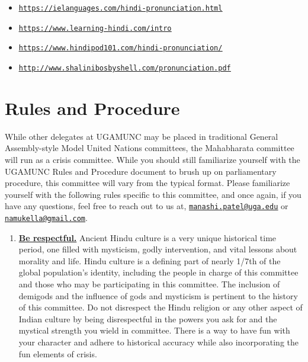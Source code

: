 \documentclass[10pt, letterpaper]{article}
\begin{document}
\begin{itemize}
\item
  
  \texttt{\href{https://ielanguages.com/hindi-pronunciation.html}{\underline{https://ielanguages.com/hindi-pronunciation.html}}}
  
\item
  
  \texttt{\href{https://www.learning-hindi.com/intro}{\underline{https://www.learning-hindi.com/intro}}}
  
\item
  
  \texttt{\href{https://www.hindipod101.com/hindi-pronunciation/}{\underline{https://www.hindipod101.com/hindi-pronunciation/}}}
  
\item
  
  \texttt{\href{http://www.shalinibosbyshell.com/pronunciation.pdf}{\underline{http://www.shalinibosbyshell.com/pronunciation.pdf}}}
  
\end{itemize}

\newpage
\section{Rules and Procedure}

While other delegates at UGAMUNC may be placed in traditional General
Assembly-style Model United Nations committees, the Mahabharata
committee will run as a crisis committee. While you should still
familiarize yourself with the UGAMUNC Rules and Procedure document to
brush up on parliamentary procedure, this committee will vary from the
typical format. Please familiarize yourself with the following rules
specific to this committee, and once again, if you have any questions,
feel free to reach out to us at,
\texttt{\href{mailto:manashi.patel@uga.edu}{\underline{manashi.patel@uga.edu}}}
or \texttt{\href{mailto:namukella@gmail.com}{\underline{namukella@gmail.com}}}.

\begin{enumerate}

\item
  
  \textbf{\underline{Be respectful.}} Ancient Hindu culture is a very
  unique historical time period, one filled with mysticism, godly
  intervention, and vital lessons about morality and life. Hindu culture
  is a defining part of nearly 1/7th of the global population's
  identity, including the people in charge of this committee and those
  who may be participating in this committee. The inclusion of demigods
  and the influence of gods and mysticism is pertinent to the history of
  this committee. Do not disrespect the Hindu religion or any other
  aspect of Indian culture by being disrespectful in the powers you ask
  for and the mystical strength you wield in committee. There is a way
  to have fun with your character and adhere to historical accuracy
  while also incorporating the fun elements of crisis.
  
\end{enumerate}
\end{document}
